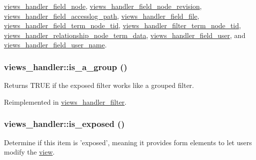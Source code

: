 \hyperlink{classviews__handler__field__node_a4f263bde5682e4c2285a0e51a7f8b472}{views\_\-handler\_\-field\_\-node}, \hyperlink{classviews__handler__field__node__revision_aa89b3130f87bc8811d777a29f8e4468c}{views\_\-handler\_\-field\_\-node\_\-revision}, \hyperlink{classviews__handler__field__accesslog__path_a9f0e65ae8a7fbc2ef5986c3519da67b2}{views\_\-handler\_\-field\_\-accesslog\_\-path}, \hyperlink{classviews__handler__field__file_aa0c76118aaf12d0938111d093411c016}{views\_\-handler\_\-field\_\-file}, \hyperlink{classviews__handler__field__term__node__tid_ac3c22862ed731d0fc71d56ba9308d120}{views\_\-handler\_\-field\_\-term\_\-node\_\-tid}, \hyperlink{classviews__handler__filter__term__node__tid_ab4f316cfbf968a2faa8e574b9df5c4f3}{views\_\-handler\_\-filter\_\-term\_\-node\_\-tid}, \hyperlink{classviews__handler__relationship__node__term__data_a85e3c68c3338ca221d436eb13914bd68}{views\_\-handler\_\-relationship\_\-node\_\-term\_\-data}, \hyperlink{classviews__handler__field__user_a94156733dfddeb57dbd856e0f574cde6}{views\_\-handler\_\-field\_\-user}, and \hyperlink{classviews__handler__field__user__name_a5879bbaa4a1e59f9509b9a5d6fbdd9b2}{views\_\-handler\_\-field\_\-user\_\-name}.\hypertarget{classviews__handler_a946a9b922261327ff2f59a0287e6b288}{
\subsubsection[{is\_\-a\_\-group}]{\setlength{\rightskip}{0pt plus 5cm}views\_\-handler::is\_\-a\_\-group ()}}
\label{classviews__handler_a946a9b922261327ff2f59a0287e6b288}
Returns TRUE if the exposed filter works like a grouped filter. 

Reimplemented in \hyperlink{classviews__handler__filter_a4a7529b9fa68f93d5343c861e7c67c3d}{views\_\-handler\_\-filter}.\hypertarget{classviews__handler_a0c01527c54c1f1372f3c4f28ae34a837}{
\subsubsection[{is\_\-exposed}]{\setlength{\rightskip}{0pt plus 5cm}views\_\-handler::is\_\-exposed ()}}
\label{classviews__handler_a0c01527c54c1f1372f3c4f28ae34a837}
Determine if this item is 'exposed', meaning it provides form elements to let users modify the \hyperlink{classview}{view}.

